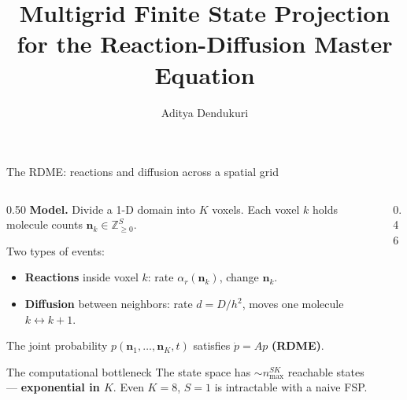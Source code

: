 \documentclass[10pt,aspectratio=169]{beamer}
\title[Multigrid FSP for RDME]{%
  Multigrid Finite State Projection\\
  for the Reaction-Diffusion Master Equation}
\author{Aditya Dendukuri}
\institute[UCSB]{University of California, Santa Barbara}
\date{}
\begin{document}
\begin{frame}\titlepage\end{frame}


\begin{frame}{The RDME: reactions and diffusion across a spatial grid}

  \begin{columns}[T]
    \begin{column}{0.50\textwidth}
      \textbf{Model.}
      Divide a 1-D domain into $K$ voxels.
      Each voxel $k$ holds molecule counts $\mathbf{n}_k \in \mathbb{Z}_{\geq 0}^S$.

      \medskip
      Two types of events:
      \begin{itemize}\setlength\itemsep{0.4em}
        \item \textcolor{slowred}{\textbf{Reactions}} inside voxel $k$:
              rate $\alpha_r(\mathbf{n}_k)$, change $\mathbf{n}_k$.
        \item \textcolor{fastblue}{\textbf{Diffusion}} between neighbors:
              rate $d = D/h^2$, moves one molecule $k \leftrightarrow k{+}1$.
      \end{itemize}

      \medskip
      The joint probability $p(\mathbf{n}_1,\ldots,\mathbf{n}_K,t)$
      satisfies $\dot p = A p$ \textbf{(RDME)}.

      \medskip
      \begin{alertblock}{The computational bottleneck}
        The state space has $\sim n_{\max}^{SK}$ reachable states ---
        \textbf{exponential in $K$}.
        Even $K{=}8$, $S{=}1$ is intractable with a naive FSP.
      \end{alertblock}
    \end{column}
    \begin{column}{0.46\textwidth}
      \begin{center}
      \end{center}
    \end{column}
  \end{columns}

\end{frame}
\end{document}
